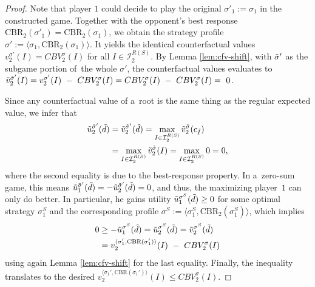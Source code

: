 \begin{proof}
  Note that player $1$ could decide to play the original $\sigma'_1 := \sigma_1$ in the constructed game.
  Together with the opponent's best response $\textrm{CBR}_2(\sigma'_1) = \textrm{CBR}_2(\sigma_1)$, we obtain the strategy profile 
  $\sigma' := \langle \sigma_1, \textrm{CBR}_2(\sigma_1) \rangle$.
  It yields the identical counterfactual values
  $v_2 ^{\sigma'} (I) = CBV_2^\sigma(I)$ for all $I\in\mathcal{I}_2^{R(S)}$.
  By Lemma \ref{lem:cfv-shift}, with ${\tilde{\sigma}}'$ as the subgame portion of~the whole $\sigma'$, the counterfactual values evaluates to
  $\tilde{v}_2 ^{{\tilde{\sigma}}'}(I)
  = v_2 ^{\sigma'} (I)~-~CBV_2^\sigma(I)
  = CBV_2^\sigma(I)~-~CBV_2^\sigma(I)
  =~0$.

  Since any counterfactual value of a~root is the same thing as the regular expected value, we infer that
  \begin{equation*}
    \begin{split}
      \tilde{u}_2 ^{{\tilde{\sigma}}'} (\tilde{d})
      &= \tilde{v}_2 ^{{\tilde{\sigma}}'} (\tilde{d})
      = \max _{I\in \mathcal{I}_2^{R(S)}} \tilde{v}_2 ^{\tilde{\sigma}} (c_{\tilde{I}}) \\
      &= \max _{I\in \mathcal{I}_2^{R(S)}} \tilde{v}_2 ^{\tilde{\sigma}} (I)
      = \max _{I\in \mathcal{I}_2^{R(S)}} 0 
      = 0,
    \end{split}
  \end{equation*}
  where the second equality is due to the best-response property.
  In a~zero-sum game, this means 
  $
  \tilde{u}_1 ^{{\tilde{\sigma}}'} (\tilde{d})
  = - \tilde{u}_2 ^{{\tilde{\sigma}}'} (\tilde{d})
  = 0
  $,
  and thus, the maximizing player~$1$ can only do better.
  In particular, he gains utility
  $
  \tilde{u}_1 ^{\sigma^S} (\tilde{d}) \ge 0
  $
  for some optimal strategy $\sigma_1^S$ and the corresponding profile
  $\sigma^S := \langle \sigma_1^S, \textrm{CBR}_2 (\sigma_1^S)\rangle$,
  which implies
  \begin{equation*}
    \begin{split}
      0
      &\ge - \tilde{u}_1 ^{\sigma^S} (\tilde{d})
      = \tilde{u}_2 ^{\sigma^S} (\tilde{d})
      = \tilde{v}_2 ^{\sigma^S} (\tilde{d}) \\
      &= v_2 ^{\langle\sigma_1', \textrm{CBR}(\sigma_1')\rangle} (I)~-~CBV_2^\sigma(I)
    \end{split}
  \end{equation*}
  using again Lemma \ref{lem:cfv-shift} for the last equality.
  Finally, the inequality translates to the desired
  $
  v_2 ^{\langle\sigma_1', \textrm{CBR}(\sigma_1')\rangle} (I) \le CBV_2^\sigma(I).
  $
\end{proof}

